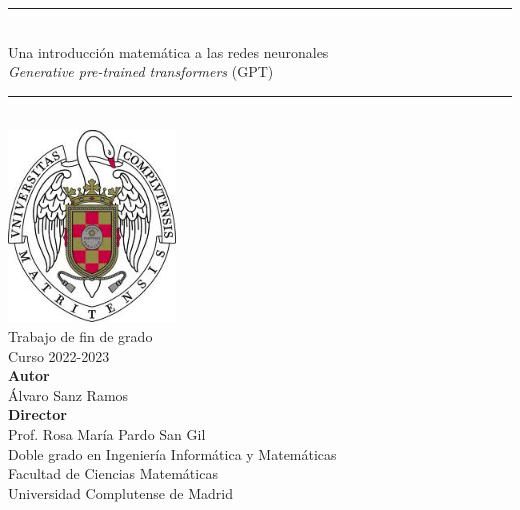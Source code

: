 \newpage
\thispagestyle{empty}

\begin{center}
    \rule{7cm}{1pt} \\
    \vspace*{0.2cm}
    \Large{Una introducción matemática a las redes neuronales} \\
    \large{\textit{Generative pre-trained transformers} (GPT)}\\
    \rule{7cm}{1pt} \\
    \vspace*{1cm} 
    \includegraphics[height=2in]{figures/escudo.jpg} \\
    \vspace{0.75cm}
    \Large{Trabajo de fin de grado} \\
    \Large{Curso 2022-2023} \\
    \vspace{0.5cm}
    \large{\textbf{Autor}} \\
    \large{Álvaro Sanz Ramos} \\ 
    \vspace{0.25cm}
    \large{\textbf{Director}} \\
    \large{Prof. Rosa María Pardo San Gil} \\

    \vspace{0.75cm}
    Doble grado en Ingeniería Informática y Matemáticas \\
    Facultad de Ciencias Matemáticas \\
    Universidad Complutense de Madrid \\
    \vspace{1cm}
\end{center}
